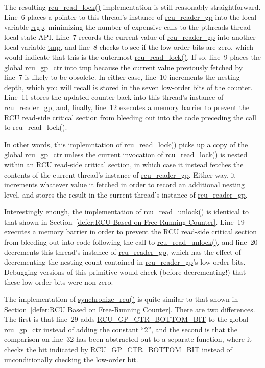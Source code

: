 The resulting \url{rcu_read_lock()} implementation is still reasonably
straightforward.
Line~6 places a pointer to this thread's instance of \url{rcu_reader_gp}
into the local variable \url{rrgp}, minimizing the number of expensive
calls to the pthreads thread-local-state API.
Line~7 records the current value of \url{rcu_reader_gp} into another
local variable \url{tmp}, and line~8 checks to see if the low-order
bits are zero, which would indicate that this is the outermost
\url{rcu_read_lock()}.
If so, line~9 places the global \url{rcu_gp_ctr} into \url{tmp} because
the current value previously fetched by line~7 is likely to be obsolete.
In either case, line~10 increments the nesting depth, which you will
recall is stored in the seven low-order bits of the counter.
Line~11 stores the updated counter back into this thread's instance
of \url{rcu_reader_gp}, and, finally, line~12 executes a memory
barrier to prevent the RCU read-side critical section from bleeding out
into the code preceding the call to \url{rcu_read_lock()}.

In other words, this implemntation of \url{rcu_read_lock()} picks up a copy
of the global \url{rcu_gp_ctr} unless the current invocation of
\url{rcu_read_lock()} is nested within an RCU read-side critical section,
in which case it instead fetches the contents of the current thread's
instance of \url{rcu_reader_gp}.
Either way, it increments whatever value it fetched in order to record
an additional nesting level, and stores the result in the current
thread's instance of \url{rcu_reader_gp}.

Interestingly enough, the implementation of \url{rcu_read_unlock()}
is identical to that shown in
Section~\ref{defer:RCU Based on Free-Running Counter}.
Line~19 executes a memory barrier in order to prevent the RCU read-side
critical section from bleeding out into code following the call
to \url{rcu_read_unlock()}, and
line~20 decrements this thread's instance of \url{rcu_reader_gp},
which has the effect of decrementing the nesting count contained in
\url{rcu_reader_gp}'s low-order bits.
Debugging versions of this primitive would check (before decrementing!)
that these low-order bits were non-zero.

The implementation of \url{synchronize_rcu()} is quite similar to
that shown in
Section~\ref{defer:RCU Based on Free-Running Counter}.
There are two differences.
The first is that line~29 adds \url{RCU_GP_CTR_BOTTOM_BIT}
to the global \url{rcu_gp_ctr} instead of adding the constant ``2'',
and the second is that the comparison on line~32 has been abstracted
out to a separate function, where it checks the bit indicated
by \url{RCU_GP_CTR_BOTTOM_BIT} instead of unconditionally checking
the low-order bit.

